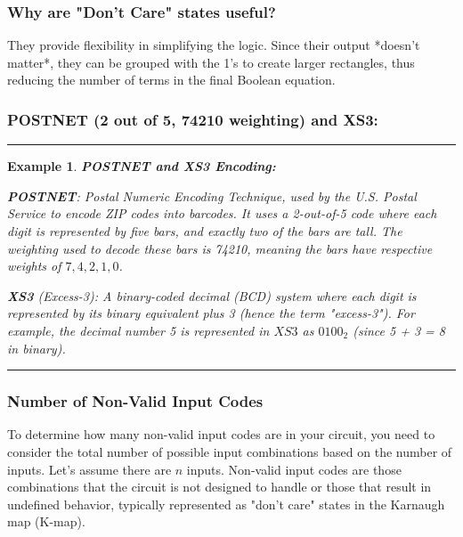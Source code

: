\documentclass[12pt]{article}
\newtheorem{example}{Example}
\newenvironment{examp}
{\vspace{0.5cm}
\hrule
\begin{example}}
{\hrule
\vspace{0.5cm}
\end{example}}
\begin{document}
\subsubsection*{Why are "Don’t Care" states useful?}
They provide flexibility in simplifying the logic. Since their output *doesn't
matter*, they can be grouped with the 1’s to create larger rectangles, thus
reducing the number of terms in the final Boolean equation.

\subsubsection*{POSTNET (2 out of 5, 74210 weighting) and XS3:}

\begin{examp}
	\vspace{.5mm}
	\textbf{POSTNET and XS3 Encoding:}
	\vspace{.5mm}
	\begin{list}{-}{\leftmargin=1em \itemindent=0em}
		\item \textbf{POSTNET}: Postal Numeric Encoding Technique, used by the
		      U.S. Postal Service to encode ZIP codes into barcodes. It uses a
		      2-out-of-5 code where each digit is represented by five bars, and
		      exactly two of the bars are tall. The weighting used to decode
		      these bars is 74210, meaning the bars have respective weights of
		      \(7, 4, 2, 1, 0\).
		\item \textbf{XS3} (Excess-3): A binary-coded
		      decimal (BCD) system where each digit is represented by its binary
		      equivalent plus 3 (hence the term "excess-3"). For example, the
		      decimal number 5 is represented in \(XS3\) as \(0100_2\) (since 5 +
		      3 = 8 in binary).
	\end{list}
\end{examp}

\subsubsection*{Number of Non-Valid Input Codes}

To determine how many non-valid input codes are in your circuit, you need to
consider the total number of possible input combinations based on the number of
inputs. Let’s assume there are \(n\) inputs. Non-valid input codes are those combinations
that the circuit is not designed to handle or those that result in undefined behavior,
typically represented as "don't care" states in the Karnaugh map (K-map).
\end{document}
